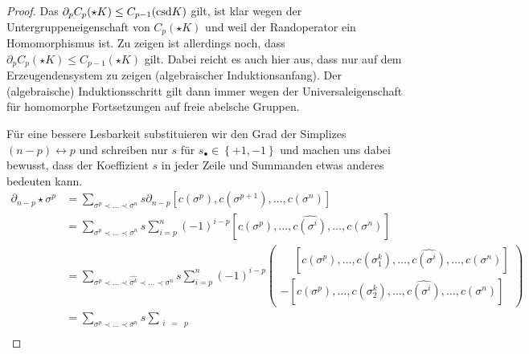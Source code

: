   \begin{proof}
    Das \( \partial_{p} C_{p}(\star K) \le C_{p-1}(\text{csd} K) \) gilt, ist klar wegen der Untergruppeneigenschaft von \( C_{p}(\star K) \) und weil der Randoperator ein Homomorphismus ist.
    Zu zeigen ist allerdings noch, dass \( \partial_{p} C_{p}(\star K) \le C_{p-1}(\star K) \) gilt. 
    Dabei reicht es auch hier aus, dass nur auf dem Erzeugendensystem zu zeigen (algebraischer Induktionsanfang).
    Der (algebraische) Induktionsschritt gilt dann immer wegen der Universaleigenschaft für homomorphe Fortsetzungen auf freie abelsche Gruppen.

    Für eine bessere Lesbarkeit substituieren wir den Grad der Simplizes \( (n-p) \leftrightarrow p \) und schreiben nur \( s \) für \( s_{\bullet} \in \left\{ +1,-1 \right\} \)
    und machen uns dabei bewusst, dass der Koeffizient \( s \) in jeder Zeile und Summanden etwas anderes bedeuten kann.
    {\allowdisplaybreaks
    \begin{align}
      \partial_{n-p}\star\sigma^{p} &= \sum_{\sigma^{p}\prec\ldots\prec\sigma^{n}} s \partial_{n-p} \left[ c(\sigma^{p}), c(\sigma^{p+1}),\ldots, c(\sigma^{n})\right] \label{eqproof1}\\
                              &= \sum_{\sigma^{p}\prec\ldots\prec\sigma^{n}} s 
                                          \sum_{i=p}^{n} (-1)^{i-p} \left[ c(\sigma^{p}),\ldots, \widehat{c(\sigma^{i})},\ldots, c(\sigma^{n})\right] \label{eqproof2}\\
                              &= \sum_{\sigma^{p}\prec\ldots\prec\widehat{\sigma^{k}}\prec\ldots\prec\sigma^{n}} s
                                          \sum_{i=p}^{n} (-1)^{i-p} 
                              \left(\begin{aligned}
                                            \phantom{-}\left[ c(\sigma^{p}),\ldots, c(\sigma_{1}^{k}),\ldots,\widehat{c(\sigma^{i})},\ldots, c(\sigma^{n})\right] \\
                                                     - \left[ c(\sigma^{p}),\ldots, c(\sigma_{2}^{k}),\ldots,\widehat{c(\sigma^{i})},\ldots, c(\sigma^{n})\right]
                              \end{aligned}\right) \label{eqproof3}\\
                              &= \sum_{\sigma^{p}\prec\ldots\prec\sigma^{n}} s 
                                          \sum_{\begin{smallmatrix}
                                                  i & = & p \\

\end{smallmatrix}}
\end{align}}
\end{proof}
